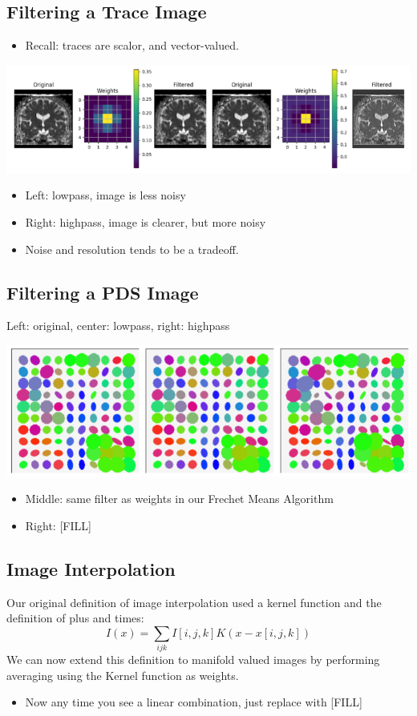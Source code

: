 \documentclass[10pt]{article}
\begin{document}
\subsection*{Filtering a Trace Image}
\begin{itemize}
	\item Recall: traces are scalor, and vector-valued.
\end{itemize}
\begin{center} 
	\includegraphics*[width=\textwidth]{W10_5.png} 
\end{center}
\begin{itemize}
	\item Left: lowpass, image is less noisy
	\item Right: highpass, image is clearer, but more noisy
	\item Noise and resolution tends to be a tradeoff.
\end{itemize}

\subsection*{Filtering a PDS Image}
Left: original, center: lowpass, right: highpass
\begin{center} 
	\includegraphics*[width=\textwidth]{W10_6.png} 
\end{center}
\begin{itemize}
	\item Middle: same filter as weights in our Frechet Means Algorithm
	\item Right: [FILL]
\end{itemize}

\subsection*{Image Interpolation}
Our original definition of image interpolation used a kernel function and the definition of plus and times:
\[I(x) = \sum_{ijk} I[i, j, k] K(x - x[i, j, k])\]
We can now extend this definition to manifold valued images by performing averaging using the Kernel function as weights.
\begin{itemize}
	\item Now any time you see a linear combination, just replace with [FILL]
\end{itemize}
\end{document}
